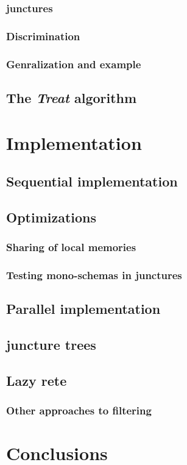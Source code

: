 \subsubsection{junctures}

\subsubsection{Discrimination}

\subsubsection{Genralization and example}

\subsection{The \textit{Treat} algorithm}

\section{Implementation}

\subsection{Sequential implementation}

\subsection{Optimizations}

\subsubsection{Sharing of local memories}

\subsubsection{Testing mono-schemas in junctures}

\subsection{Parallel implementation}

\subsection{juncture trees}

\subsection{Lazy rete}

\subsubsection{Other approaches to filtering}

\section{Conclusions}


